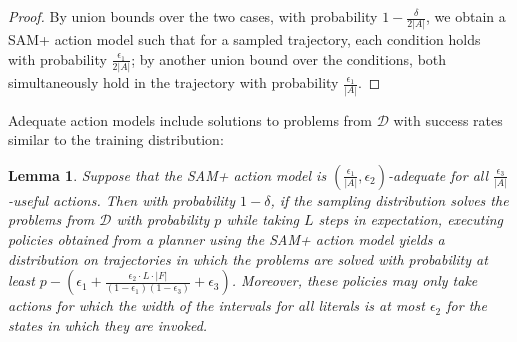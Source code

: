 \documentclass[letterpaper]{article} %
\newtheorem{lemma}{Lemma}
\begin{document}
\begin{proof}
By union bounds over the two cases, with probability $1-\frac{\delta}{2|A|}$, we obtain a SAM+ action model such that for a sampled trajectory, each condition holds with probability $\frac{\epsilon_1}{2|A|}$; by another union bound over the conditions, both simultaneously hold in the trajectory with probability $\frac{\epsilon_1}{|A|}$.
\end{proof}

\noindent
Adequate action models include solutions to problems from $\mathcal{D}$ with success rates similar to the training distribution:

\begin{lemma}\label{lem:sam-success}
Suppose that the SAM+ action model is $(\frac{\epsilon_1}{|A|},\epsilon_2)$-adequate for all $\frac{\epsilon_3}{|A|}$-useful actions. Then with probability $1-\delta$, if the sampling distribution solves the problems from $\mathcal{D}$ with probability $p$ while taking $L$ steps in expectation, executing policies obtained from a planner using the SAM+ action model yields a distribution on trajectories in which the problems are solved with probability at least $p-(\epsilon_1+\frac{\epsilon_2\cdot L\cdot |F|}{(1-\epsilon_1)(1-\epsilon_3)}+\epsilon_3)$.
Moreover, these policies may only take actions for which the width of the intervals for all literals is at most $\epsilon_2$ for the states in which they are invoked.
\end{lemma}
\end{document}
